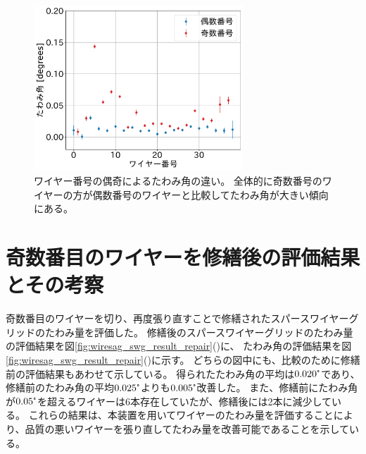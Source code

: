 \documentclass[../../main.tex]{subfiles}
\begin{document}
\begin{figure}[H]
    \centering
    \includegraphics[width=0.7\textwidth]{wiresag_swg/swg_sag_angle_before_even_odd.pdf}
    \caption{ワイヤー番号の偶奇によるたわみ角の違い。
    全体的に奇数番号のワイヤーの方が偶数番号のワイヤーと比較してたわみ角が大きい傾向にある。}
    \label{fig:wiresag_swg_even_odd}
\end{figure}

\section{奇数番目のワイヤーを修繕後の評価結果とその考察}
奇数番目のワイヤーを切り、再度張り直すことで修繕されたスパースワイヤーグリッドのたわみ量を評価した。
修繕後のスパースワイヤーグリッドのたわみ量の評価結果を図\ref{fig:wiresag_swg_result_repair}()に、
たわみ角の評価結果を図\ref{fig:wiresag_swg_result_repair}()に示す。
どちらの図中にも、比較のために修繕前の評価結果もあわせて示している。
得られたたわみ角の平均は$0.020\tcdegree$であり、修繕前のたわみ角の平均$0.025\tcdegree$よりも$0.005\tcdegree$改善した。
また、修繕前にたわみ角が$0.05\tcdegree$を超えるワイヤーは6本存在していたが、修繕後には2本に減少している。
これらの結果は、本装置を用いてワイヤーのたわみ量を評価することにより、品質の悪いワイヤーを張り直してたわみ量を改善可能であることを示している。


\end{document}
